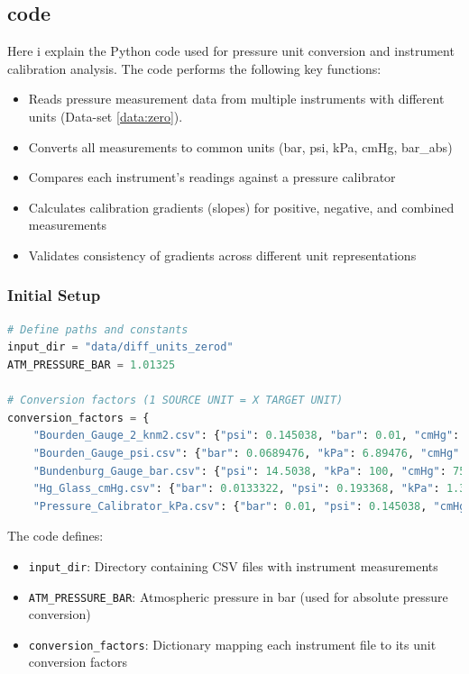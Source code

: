 \documentclass{article}
\begin{document}
\subsection{code}\label{subsec:code}\small
Here i explain the Python code used for pressure unit conversion and instrument calibration analysis. The code performs the following key functions:
\begin{itemize}[itemsep=-1mm]
	\item Reads pressure measurement data from multiple instruments with different units (Data-set \ref{data:zero}).
	\item Converts all measurements to common units (bar, psi, kPa, cmHg, bar\_abs)
	\item Compares each instrument's readings against a pressure calibrator
	\item Calculates calibration gradients (slopes) for positive, negative, and combined measurements
	\item Validates consistency of gradients across different unit representations
\end{itemize}
\vspace{-1.4em}
\subsubsection{Initial Setup}
\vspace{-0.5em}
\begin{lstlisting}[language=Python]
# Define paths and constants
input_dir = "data/diff_units_zerod"
ATM_PRESSURE_BAR = 1.01325

# Conversion factors (1 SOURCE UNIT = X TARGET UNIT)
conversion_factors = {
	"Bourden_Gauge_2_knm2.csv": {"psi": 0.145038, "bar": 0.01, "cmHg": 0.750062, "kPa": 1.0, "bar_abs": 0.01},
	"Bourden_Gauge_psi.csv": {"bar": 0.0689476, "kPa": 6.89476, "cmHg": 5.17149, "bar_abs": 0.0689476},
	"Bundenburg_Gauge_bar.csv": {"psi": 14.5038, "kPa": 100, "cmHg": 75.0062, "bar_abs": 1.0},
	"Hg_Glass_cmHg.csv": {"bar": 0.0133322, "psi": 0.193368, "kPa": 1.33322, "bar_abs": 0.0133322},
	"Pressure_Calibrator_kPa.csv": {"bar": 0.01, "psi": 0.145038, "cmHg": 0.750062, "bar_abs": 0.01}}
\end{lstlisting}

The code defines:
\begin{itemize}[itemsep=-1mm]
	\item \texttt{input\_dir}: Directory containing CSV files with instrument measurements
	\item \texttt{ATM\_PRESSURE\_BAR}: Atmospheric pressure in bar (used for absolute pressure conversion)
	\item \texttt{conversion\_factors}: Dictionary mapping each instrument file to its unit conversion factors
\end{itemize}
\vspace{-1.4em}
\end{document}
